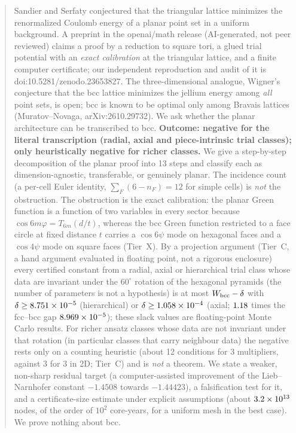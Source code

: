 \documentclass[10pt]{article}
\theoremstyle{remark}
\begin{document}
\begin{abstract}
Sandier and Serfaty conjectured that the triangular lattice minimizes the renormalized Coulomb energy of a planar point set in a
uniform background. A preprint in the openai/math release (AI-generated, not peer reviewed) claims a proof by a reduction to square tori,
a glued trial potential with an \emph{exact calibration} at the triangular lattice, and a finite computer certificate; our independent
reproduction and audit of it is doi:10.5281/zenodo.23653827. The three-dimensional analogue, Wigner's conjecture that the bcc lattice
minimizes the jellium energy among \emph{all} point sets, is open; bcc is known to be optimal only among Bravais lattices (Muratov--Novaga,
arXiv:2610.29732). We ask whether the planar architecture can be transcribed to bcc. \textbf{Outcome: negative for the literal transcription (radial, axial and piece-intrinsic trial classes); only heuristically negative for richer classes.}
We give a step-by-step decomposition of the planar proof into 13 steps and classify each as dimension-agnostic, transferable, or genuinely
planar. The incidence count (a per-cell Euler identity, $\sum_F(6-n_F)=12$ for simple cells) is \emph{not} the obstruction. The obstruction is the
exact calibration: the planar Green function is a function of two variables in every sector because $\cos 6m\varphi=T_{6m}(d/t)$,
whereas the bcc Green function restricted to a face circle at fixed distance $t$ carries a $\cos6\psi$ mode on hexagonal faces and a
$\cos4\psi$ mode on square faces (Tier~X). By a projection argument (Tier~C, a hand argument evaluated in floating point, not a rigorous enclosure) every certified constant from a radial, axial or
hierarchical trial class whose data are invariant under the $60^\circ$ rotation of the hexagonal pyramids (the number of parameters is not a hypothesis) is at most $W_{\rm bcc}-\delta$ with $\delta\ge\BSlackHier$ (hierarchical) or
$\delta\ge\BSlackAxial$ (axial; $\BRatioAxial$ times the fcc--bcc gap $\BGapFcc$); these slack values are floating-point Monte Carlo results.
For richer ansatz classes whose data are not invariant under that rotation (in particular classes that carry neighbour data) the negative rests only on a counting heuristic (about 12 conditions for 3 multipliers,
against 3 for 3 in 2D; Tier~C) and is \emph{not} a theorem. We state a weaker, non-sharp residual target (a computer-assisted improvement of the
Lieb--Narnhofer constant $-1.4508$ towards $-1.44423$), a falsification test for it, and a certificate-size estimate under explicit assumptions
(about $\BNodesThreeD$ nodes, of the order of $10^2$ core-years, for a uniform mesh in the best case). We prove nothing about bcc.
\end{abstract}
\end{document}
